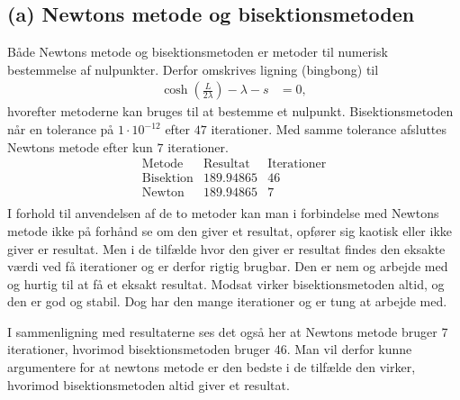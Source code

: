 \subsection*{(a) Newtons metode og bisektionsmetoden}
%
Både Newtons metode og bisektionsmetoden er metoder til numerisk bestemmelse af nulpunkter.
Derfor omskrives ligning (bingbong) til
%
\begin{align*}
\cosh( \frac{L}{2\lambda}) - \lambda - s &= 0,
\end{align*}
%
hvorefter metoderne kan bruges til at bestemme et nulpunkt.
Bisektionsmetoden når en tolerance på $1\cdot 10^{-12}$ efter $47$ iterationer.
Med samme tolerance afsluttes Newtons metode efter kun $7$ iterationer.
$$
\begin{array}{l|c|c}
\text{Metode} & \text{Resultat} & \text{Iterationer}\\
\hline
\text{Bisektion}	& 189.94865 & 46\\
\text{Newton}		& 189.94865 & 7\\
\end{array}
$$
I forhold til anvendelsen af de to metoder kan man i forbindelse med Newtons metode ikke på forhånd se om den giver et resultat, opfører sig kaotisk eller ikke giver er resultat. 
Men i de tilfælde hvor den giver er resultat findes den eksakte værdi ved få iterationer og er derfor rigtig brugbar. 
Den er nem og arbejde med og hurtig til at få et eksakt resultat. 
%
Modsat virker bisektionsmetoden altid, og den er god og stabil. Dog har den mange iterationer og er tung at arbejde med.

I sammenligning med resultaterne ses det også her at Newtons metode bruger 7 iterationer, hvorimod bisektionsmetoden bruger 46. 
%
Man vil derfor kunne argumentere for at newtons metode er den bedste i de tilfælde den virker, hvorimod bisektionsmetoden altid giver et resultat. 
%